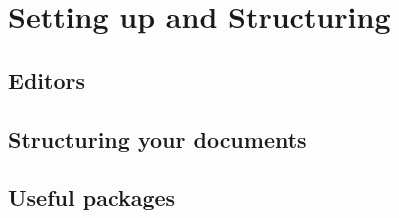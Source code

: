\section{Setting up and Structuring}

\subsection{Editors}

\subsection{Structuring your documents}

\subsection{Useful packages}